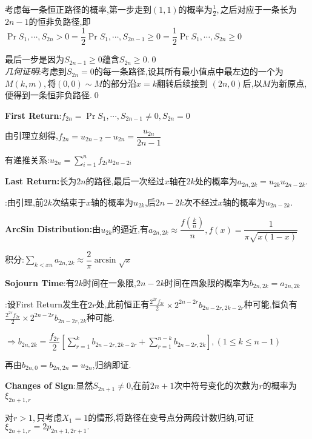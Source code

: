 考虑每一条恒正路径的概率,第一步走到$ (1,1)$的概率为$ \frac{1}{2},$之后对应于一条长为$ 2n-1$的恒非负路径,即
$ \Pr{S_1,\cdots ,S_{2n}>0}=\dfrac{1}{2}\Pr{S_1,\cdots ,S_{2n-1}\ge 0} = \dfrac{1}{2}\Pr{S_1,\cdots ,S_{2n}\ge 0}$

最后一步是因为$ S_{2n-1}\ge 0$蕴含$ S_{2n}\ge 0. $\qed
\\

\textit{几何证明}:考虑到$ S_{2n}=0$的每一条路径,设其所有最小值点中最左边的一个为$ M(k,m),$将$ (0,0)\sim M$的部分沿$ x=k$翻转后续接到
$ (2n,0)$后,以$ M$为新原点,便得到一条恒非负路径.\qed
\vspace{0.6cm}

  \textbf{First Return}:$ f_{2n} = \Pr{S_1,\cdots ,S_{2n-1}\neq 0, S_{2n} = 0}$

  由引理立刻得,$ f_{2n} = u_{2n-2}-u_{2n} = \dfrac{u_{2n}}{2n-1}$

  有递推关系:$ u_{2n}=\sum_{i=1}^n{f_{2i}u_{2n-2i}}$
  \vspace{0.6cm}

  \textbf{Last Return:}长为$ 2n$的路径,最后一次经过$ x$轴在$ 2k$处的概率为$ a_{2n,2k} = u_{2k}u_{2n-2k}$.

  \proof:由引理,前$ 2k$次结束于$ x$轴的概率为$ u_{2k}$,后$ 2n-2k$次不经过$ x$轴的概率为$ u_{2n-2k}$.

  \textbf{ArcSin Distribution:}由$ u_{2k}$的逼近,有$ a_{2n,2k}\approx \dfrac{f(\frac{k}{n})}{n},f(x)=\dfrac{1}{\pi\sqrt{x(1-x)}}$

  积分:$\sum_{k<xn}a_{2n,2k}\approx \dfrac{2}{\pi}\arcsin{\sqrt{x}}$
\vspace{0.6cm}

\textbf{Sojourn Time}:有$ 2k$时间在一象限,$ 2n-2k$时间在四象限的概率为$ b_{2n,2k} = a_{2n,2k}$

\proof:设First Return发生在$ 2r$处,此前恒正有$ \frac{2^{2r}f_{2r}}{2} \times 2^{2n-2r}b_{2n-2r,2k-2r}$种可能,恒负有
$ \frac{2^{2r}f_{2r}}{2}\times 2^{2n-2r}b_{2n-2r,2k}$种可能.

$ \Rightarrow b_{2n,2k} = \dfrac{f_{2r}}{2}[\sum_{r=1}^k{b_{2n-2r,2k-2r}} + \sum_{r=1}^{n-k}{b_{2n-2r,2k}}],(1\le k \le n-1)$

再由$ b_{2n,0}=b_{2n,2n}=u_{2n}$,归纳即证.
\vspace{0.6cm}

\textbf{Changes of Sign}:显然$ S_{2n+1}\neq 0$,在前$ 2n+1$次中符号变化的次数为$ r$的概率为$ \xi_{2n+1,r} $

对$ r>1,$只考虑$ X_1=1$的情形,将路径在变号点分两段计数归纳,可证$ \xi_{2n+1,r}=2p_{2n+1,2r+1}.$

